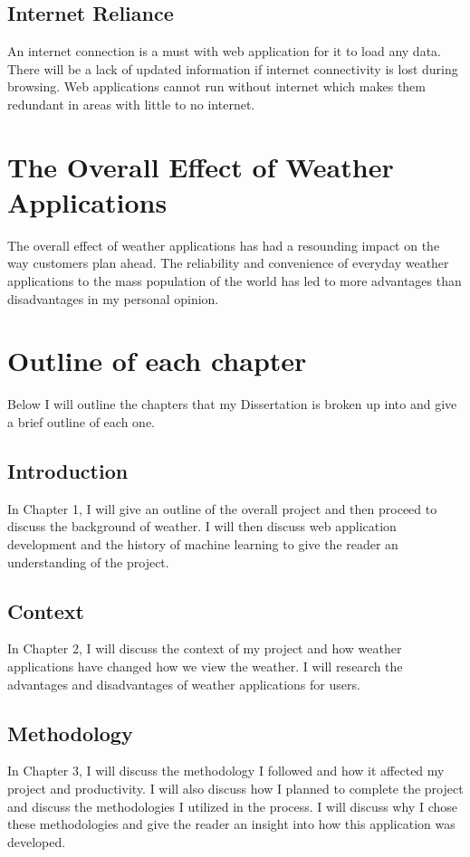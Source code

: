 \subsection{Internet Reliance}

An internet connection is a must with web application for it to load any data. There will be a lack of updated information if internet connectivity is lost during browsing. Web applications cannot run without internet which makes them redundant in areas with little to no internet. 

\section{The Overall Effect of Weather Applications}

The overall effect of weather applications has had a resounding impact on the way customers plan ahead. The reliability and convenience of everyday weather applications to the mass population of the world has led to more advantages than disadvantages in my personal opinion.
\newpage
\section{Outline of each chapter}
Below I will outline the chapters that my Dissertation is broken up into and give a brief outline of each one.

\subsection{Introduction}
In Chapter 1, I will give an outline of the overall project and then proceed to discuss the background of weather. I will then discuss web application development and the history of machine learning to give the reader an understanding of the project.

\subsection{Context}
In Chapter 2, I will discuss the context of my project and how weather applications have changed how we view the weather. I will research the advantages and disadvantages of weather applications for users.

\subsection{Methodology}
In Chapter 3, I will discuss the methodology I followed and how it affected my project and productivity. I will also discuss how I planned to complete the project and discuss the methodologies I utilized in the process. I will discuss why I chose these methodologies and give the reader an insight into how this application was developed. 

